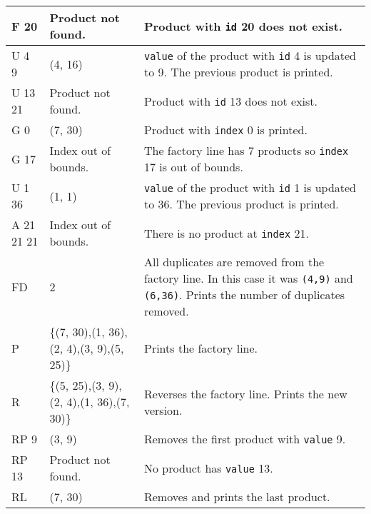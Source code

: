\documentclass[10pt]{article}
\begin{document}
\begin{table}[H]
\begin{tabular}{||p{1.6cm}|p{4cm}|p{8.5cm}||}
        F 20 & Product not found. & Product with \texttt{id} 20 does not exist. \\
        \hline
        
        U 4 9 & (4, 16) & \texttt{value} of the product with \texttt{id} 4 is updated to 9. The previous product is printed. \\
        \hline
        
        U 13 21 & Product not found. & Product with \texttt{id} 13 does not exist.\\
        \hline
        
        G 0 & (7, 30) & Product with \texttt{index} 0 is printed. \\
        \hline
        
        G 17 & Index out of bounds. & The factory line has 7 products so \texttt{index} 17 is out of bounds. \\
        \hline
        
        U 1 36 & (1, 1) & \texttt{value} of the product with \texttt{id} 1 is updated to 36. The previous product is printed. \\
        \hline
        
        A 21 21 21 & Index out of bounds. & There is no product at \texttt{index} 21. \\
        \hline
        
        FD & 2 & All duplicates are removed from the factory line. In this case it was \texttt{(4,9)} and \texttt{(6,36)}. Prints the number of duplicates removed. \\
        \hline
        
        P &  \{(7, 30),(1, 36),(2, 4),\newline(3, 9),(5, 25)\} & Prints the factory line. \\
        \hline
        
        R &  \{(5, 25),(3, 9),(2, 4),\newline(1, 36),(7, 30)\} & Reverses the factory line. Prints the new version. \\
        \hline
        
        RP 9 & (3, 9) & Removes the first product with \texttt{value} 9. \\
        \hline
        
        RP 13 & Product not found. & No product has \texttt{value} 13. \\
        \hline
        
        RL & (7, 30) & Removes and prints the last product. \\
        \hline
        

\end{tabular}
\end{table}
\end{document}
